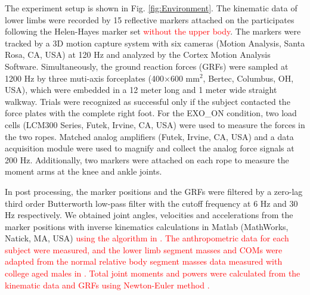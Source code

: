 \documentclass[twocolumn,cleanfoot,10pt]{asme2ej}
\begin{document}
The experiment setup is shown in Fig. \ref{fig:Environment}.
The kinematic data of lower limbs were recorded by 15 reflective markers attached on the participates following the Helen-Hayes marker set \cite{RN24} \textcolor{red}{without the upper body}.
The markers were tracked by a 3D motion capture system with six cameras (Motion Analysis, Santa Rosa, CA, USA) at 120 Hz and analyzed by the Cortex Motion Analysis Software.
Simultaneously, the ground reaction forces (GRFs) were sampled at 1200 Hz by three muti-axis forceplates (400$\times$600 mm$^{2}$, Bertec, Columbus, OH, USA), which were embedded in a 12 meter long and 1 meter wide straight walkway.
Trials were recognized as successful only if the subject contacted the force plates with the complete right foot.
For the EXO\_ON condition, two load cells (LCM300 Series, Futek, Irvine, CA, USA) were used to measure the forces in the two ropes.
Matched analog amplifiers (Futek, Irvine, CA, USA) and a data acquisition module were used to magnify and collect the analog force signals at 200 Hz.
Additionally, two markers were attached on each rope to measure the moment arms at the knee and ankle joints.

In post processing, the marker positions and the GRFs were filtered by a zero-lag third order Butterworth low-pass filter with the cutoff frequency at 6 Hz and 30 Hz respectively.
We obtained joint angles, velocities and accelerations from the marker positions with inverse kinematics calculations in Matlab (MathWorks, Natick, MA, USA) \textcolor{red}{using the algorithm in \cite{RN24}.
The anthropometric data for each subject were measured, and the lower limb segment masses and COMs were adapted from the normal relative body segment masses data measured with college aged males in \cite{de1996adjustments}.
Total joint moments and powers were calculated from the kinematic data and GRFs using Newton-Euler method \cite{kane1985dynamics}.}
\end{document}
